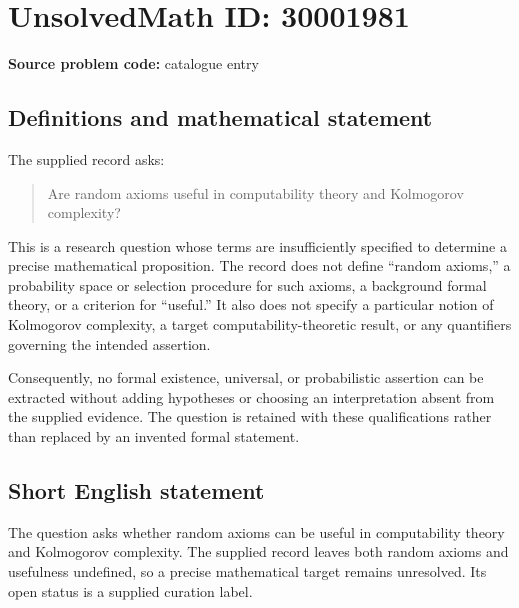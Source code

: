\documentclass[11pt]{article}
\begin{document}
\section*{UnsolvedMath ID: 30001981}
\textbf{Source problem code:} catalogue entry
\subsection{Definitions and mathematical statement}
The supplied record asks:
\begin{quote}
Are random axioms useful in computability theory and Kolmogorov complexity?
\end{quote}
This is a research question whose terms are insufficiently specified to determine a precise mathematical proposition. The record does not define ``random axioms,'' a probability space or selection procedure for such axioms, a background formal theory, or a criterion for ``useful.'' It also does not specify a particular notion of Kolmogorov complexity, a target computability-theoretic result, or any quantifiers governing the intended assertion.

Consequently, no formal existence, universal, or probabilistic assertion can be extracted without adding hypotheses or choosing an interpretation absent from the supplied evidence. The question is retained with these qualifications rather than replaced by an invented formal statement.
\subsection{Short English statement}
The question asks whether random axioms can be useful in computability theory and Kolmogorov complexity. The supplied record leaves both random axioms and usefulness undefined, so a precise mathematical target remains unresolved. Its open status is a supplied curation label.
\end{document}
